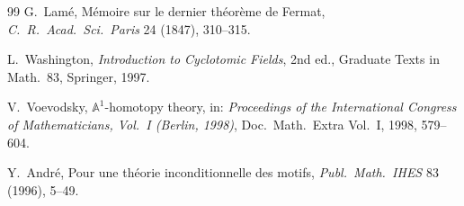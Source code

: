\documentclass[11pt,a4paper]{article}
\theoremstyle{plain}
\theoremstyle{definition}
\begin{document}
\begin{thebibliography}{99}
 G.\ Lam\'e, M\'emoire sur le dernier th\'eor\`eme de Fermat, \emph{C.\ R.\ Acad.\ Sci.\ Paris} 24 (1847), 310--315.

 L.\ Washington, \emph{Introduction to Cyclotomic Fields}, 2nd ed., Graduate Texts in Math.~83, Springer, 1997.

 V.\ Voevodsky, $\mathbb{A}^1$-homotopy theory, in: \emph{Proceedings of the International Congress of Mathematicians, Vol.~I (Berlin, 1998)}, Doc.\ Math.\ Extra Vol.~I, 1998, 579--604.

 Y.\ Andr\'e, Pour une th\'eorie inconditionnelle des motifs, \emph{Publ.\ Math.\ IHES} 83 (1996), 5--49.

\end{thebibliography}
\end{document}
